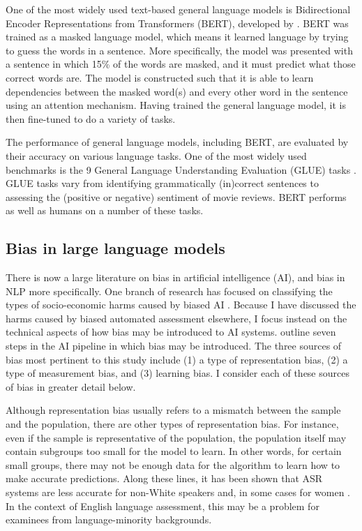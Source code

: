 \documentclass [PhD] {uclathes}
\begin{document}
One of the most widely used text-based general language models is Bidirectional Encoder Representations from Transformers (BERT), developed by \citet{devlin2018}. BERT was trained as a masked language model, which means it learned language by trying to guess the words in a sentence. More specifically, the model was presented with a sentence in which 15\% of the words are masked, and it must predict what those correct words are. The model is constructed such that it is able to learn dependencies between the masked word(s) and every other word in the sentence using an attention mechanism. Having trained the general language model, it is then fine-tuned to do a variety of tasks.

The performance of general language models, including BERT, are evaluated by their accuracy on various language tasks. One of the most widely used benchmarks is the 9 General Language Understanding Evaluation (GLUE) tasks \citep{wang2018glue}. GLUE tasks vary from identifying grammatically (in)correct sentences to assessing the (positive or negative) sentiment of movie reviews. BERT performs as well as humans on a number of these tasks.

\subsection{Bias in large language models}
\label{lit_ml_bias}

There is now a large literature on bias in artificial intelligence (AI), and bias in NLP more specifically. One branch of research has focused on classifying the types of socio-economic harms caused by biased AI \citep[e.g.][]{blodgett2020}. Because I have discussed the harms caused by biased automated assessment elsewhere, I focus instead on the technical aspects of how bias may be introduced to AI systems. \citet{suresh2021framework} outline seven steps in the AI pipeline in which bias may be introduced. The three sources of bias most pertinent to this study include (1) a type of representation bias, (2) a type of measurement bias, and (3) learning bias. I consider each of these sources of bias in greater detail below.

Although representation bias usually refers to a mismatch between the sample and the population, there are other types of representation bias. For instance, even if the sample is representative of the population, the population itself may contain subgroups too small for the model to learn. In other words, for certain small groups, there may not be enough data for the algorithm to learn how to make accurate predictions. Along these lines, it has been shown that ASR systems are less accurate for non-White speakers \citep{koenecke2020} and, in some cases for women \citep{tatman2017a, tatman2017b}. In the context of English language assessment, this may be a problem for examinees from language-minority backgrounds.
\end{document}
